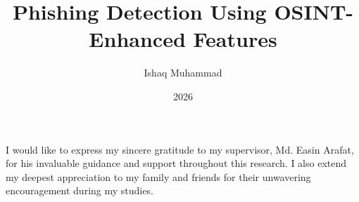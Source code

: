 \documentclass[
]{elteikthesis}[2024/04/26]
\title{Phishing Detection Using OSINT-Enhanced Features} %
\date{2026} %
\author{Ishaq Muhammad}
\affiliation{Assistant Lecturer} %
\begin{document}


\maketitle


\cleardoublepage


\tableofcontents
\cleardoublepage


\cleardoublepage

\cleardoublepage

\cleardoublepage

\cleardoublepage

\cleardoublepage

\cleardoublepage

\cleardoublepage

\chapter*{\acklabel}
I would like to express my sincere gratitude to my supervisor, Md. Easin Arafat, for his invaluable guidance and support throughout this research. I also extend my deepest appreciation to my family and friends for their unwavering encouragement during my studies.

\appendix
\cleardoublepage

{}
\printbibliography[title=\biblabel]
\cleardoublepage

{}
\listoffigures
\cleardoublepage

\cleardoublepage




\end{document}
